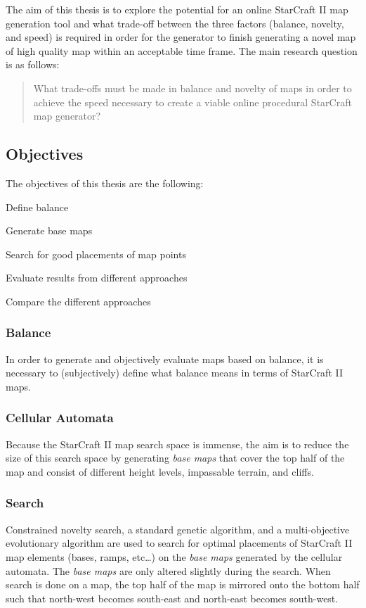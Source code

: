 The aim of this thesis is to explore the potential for an online StarCraft II map generation tool and what trade-off between the three factors (balance, novelty, and speed) is required in order for the generator to finish generating a novel map of high quality map within an acceptable time frame. The main research question is as follows:
\begin{quote}
What trade-offs must be made in balance and novelty of maps in order to achieve the speed necessary to create a viable online procedural StarCraft map generator?
\end{quote}

\subsection{Objectives}
\label{introduction_starcraft_objectives}
The objectives of this thesis are the following:
\begin{my_enumerate}
\item Define balance
\item Generate base maps
\item Search for good placements of map points
\item Evaluate results from different approaches
\item Compare the different approaches
\end{my_enumerate}

\subsubsection{Balance}
In order to generate and objectively evaluate maps based on balance, it is necessary to (subjectively) define what balance means in terms of StarCraft II maps.
\subsubsection{Cellular Automata}
Because the StarCraft II map search space is immense, the aim is to reduce the size of this search space by generating \textit{base maps} that cover the top half of the map and consist of different height levels, impassable terrain, and cliffs. 
\subsubsection{Search}
Constrained novelty search, a standard genetic algorithm, and a multi-objective evolutionary algorithm are used to search for optimal placements of StarCraft II map elements (bases, ramps, etc\ldots) on the \textit{base maps} generated by the cellular automata. The \textit{base maps} are only altered slightly during the search. When search is done on a map, the top half of the map is mirrored onto the bottom half such that north-west becomes south-east and north-east becomes south-west.
